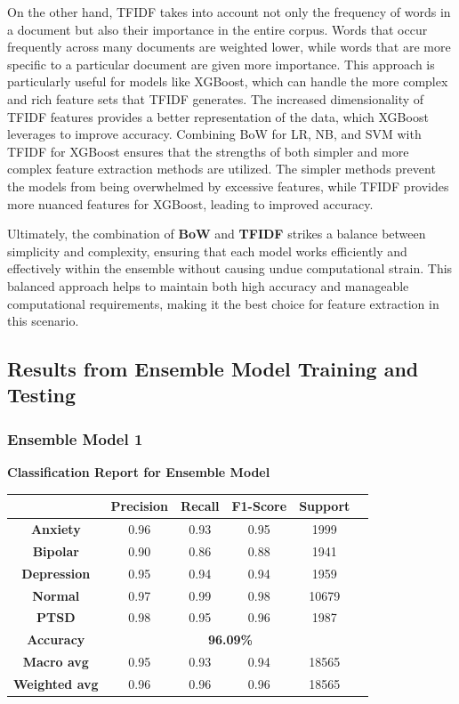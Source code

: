 \noindent
On the other hand, TFIDF takes into account not only the frequency of words in a document but also their importance in the entire corpus. Words that occur frequently across many documents are weighted lower, while words that are more specific to a particular document are given more importance. This approach is particularly useful for models like XGBoost, which can handle the more complex and rich feature sets that TFIDF generates. The increased dimensionality of TFIDF features provides a better representation of the data, which XGBoost leverages to improve accuracy. Combining BoW for LR, NB, and SVM with TFIDF for XGBoost ensures that the strengths of both simpler and more complex feature extraction methods are utilized. The simpler methods prevent the models from being overwhelmed by excessive features, while TFIDF provides more nuanced features for XGBoost, leading to improved accuracy.

\vspace{1em}

\noindent
Ultimately, the combination of \textbf{BoW} and \textbf{TFIDF} strikes a balance between simplicity and complexity, ensuring that each model works efficiently and effectively within the ensemble without causing undue computational strain. This balanced approach helps to maintain both high accuracy and manageable computational requirements, making it the best choice for feature extraction in this scenario.


\pagebreak

\subsection{Results from Ensemble Model Training and Testing}
\subsubsection{Ensemble Model 1}
\begin{center}
    \textbf{Classification Report for Ensemble Model} \\[0.5em]
    \begin{tabular}{|c|c|c|c|c|c|}
        \hline
        & \textbf{Precision} & \textbf{Recall} & \textbf{F1-Score} & \textbf{Support} \\ \hline
        \textbf{Anxiety}    & 0.96 & 0.93 & 0.95 & 1999 \\ \hline
        \textbf{Bipolar}    & 0.90 & 0.86 & 0.88 & 1941 \\ \hline
        \textbf{Depression} & 0.95 & 0.94 & 0.94 & 1959 \\ \hline
        \textbf{Normal}     & 0.97 & 0.99 & 0.98 & 10679 \\ \hline
        \textbf{PTSD}       & 0.98 & 0.95 & 0.96 & 1987 \\ \hline
        \textbf{Accuracy}   & \multicolumn{4}{c|}{\textbf{96.09\%}} \\ \hline
        \textbf{Macro avg}  & 0.95 & 0.93 & 0.94 & 18565 \\ \hline
        \textbf{Weighted avg} & 0.96 & 0.96 & 0.96 & 18565 \\ \hline
    \end{tabular}
\end{center}

